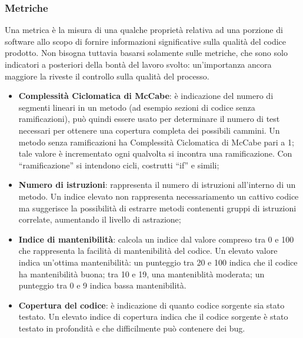 \subsubsection{Metriche}
Una metrica è la misura di una qualche proprietà relativa ad una porzione di software allo scopo di fornire informazioni significative sulla qualità del codice prodotto.
Non bisogna tuttavia basarsi solamente sulle metriche, che sono solo indicatori a posteriori della bontà del lavoro svolto: un'importanza ancora maggiore la riveste il controllo sulla qualità del processo.
\begin{itemize}
\item \textbf{Complessità Ciclomatica di McCabe}: è indicazione del numero di segmenti lineari in un metodo (ad esempio sezioni di codice senza ramificazioni), può quindi essere usato per determinare il numero di test necessari per ottenere una copertura completa dei possibili cammini. 
Un metodo senza ramificazioni ha Complessità Ciclomatica di McCabe pari a 1; tale valore è incrementato ogni qualvolta si incontra una ramificazione. 
Con “ramificazione” si intendono cicli, costrutti “if” e simili;

\item \textbf{Numero di istruzioni}: rappresenta il numero di istruzioni all'interno di un metodo. 
Un indice elevato non rappresenta necessariamento un cattivo codice ma suggerisce la possibilità di estrarre metodi contenenti gruppi di istruzioni correlate, aumentando il livello di astrazione;

\item \textbf{Indice di mantenibilità}: calcola un indice dal valore compreso tra 0 e 100 che rappresenta la facilità di mantenibilità del codice. 
Un elevato valore indica un'ottima mantenibilità: un punteggio tra 20 e 100 indica che il codice ha mantenibilità buona; tra 10 e 19, una manteniblità moderata; un punteggio tra 0 e 9 indica bassa mantenibilità.

\item \textbf{Copertura del codice}: è indicazione di quanto codice sorgente sia stato testato. Un elevato indice di copertura indica che il codice sorgente è stato testato in profondità e che difficilmente può contenere dei bug.

\end{itemize}